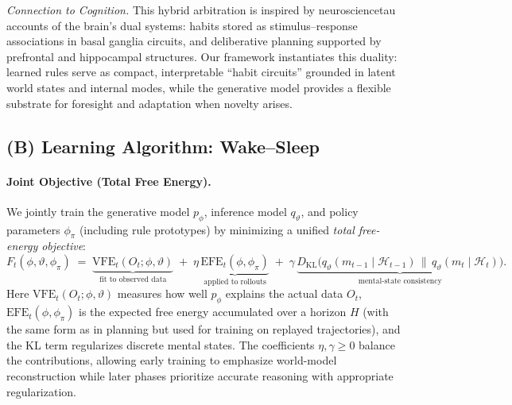 \documentclass{article} %
\begin{document}
{\it Connection to Cognition.} This hybrid arbitration is inspired by neurosciencetau accounts of the brain’s dual systems: habits stored as stimulus–response associations in basal ganglia circuits, and deliberative planning supported by prefrontal and hippocampal structures.  
Our framework instantiates this duality: learned rules serve as compact, interpretable “habit circuits” grounded in latent world states and internal modes, while the generative model provides a flexible substrate for foresight and adaptation when novelty arises.  


\subsection{(B) Learning Algorithm: Wake--Sleep}
\label{subsec:wake_sleep_learning}

\paragraph{Joint Objective (Total Free Energy).}
We jointly train the generative model $p_\phi$, inference model $q_\vartheta$, and policy parameters $\phi_\pi$ 
(including rule prototypes) by minimizing a unified \emph{total free-energy objective}:
{\small\begin{equation}
\label{eq:total_objective}
F_t(\phi,\vartheta,\phi_\pi)
\;=\;
\underbrace{\text{VFE}_t(O_t;\phi,\vartheta)}_{\text{fit to observed data}}
\;+\; \eta\,\underbrace{\text{EFE}_t(\phi,\phi_\pi)}_{\text{applied to rollouts}}
\;+\; \gamma\,\underbrace{D_{\mathrm{KL}}\!\big(q_\vartheta(m_{t-1}\mid\mathcal H_{t-1})\,\|\,q_\vartheta(m_t\mid\mathcal H_t)\big)}_{\text{mental-state consistency}}.
\end{equation}}
Here $\text{VFE}_t(O_t;\phi,\vartheta)$ measures how well $p_\phi$ explains the actual data $O_t$, 
$\text{EFE}_t(\phi,\phi_\pi)$ is the expected free energy accumulated over a horizon $H$ (with the same form as in planning but used for training on replayed trajectories), 
and the KL term regularizes discrete mental states. The coefficients $\eta,\gamma \ge 0$ balance the contributions, allowing early training to emphasize world-model reconstruction while later phases prioritize accurate reasoning with appropriate regularization. 
\end{document}
